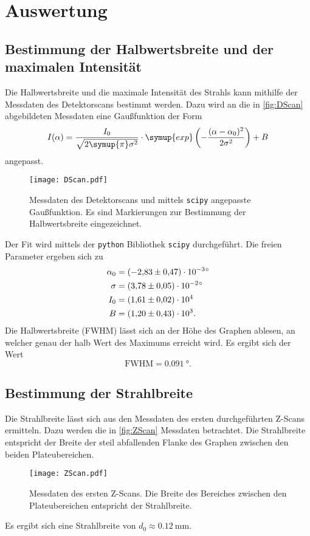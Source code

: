 \section{Auswertung}
\label{sec:Auswertung}

\subsection{Bestimmung der Halbwertsbreite und der maximalen Intensität}
Die Halbwertsbreite und die maximale Intensität des Strahls kann mithilfe der Messdaten des Detektorscans bestimmt werden.
Dazu wird an die in \autoref{fig:DScan} abgebildeten Messdaten eine Gaußfunktion der Form
\begin{equation*}
  I(\alpha) = \frac{I_0}{\sqrt{2\symup{\pi}\sigma^2}}\cdot \symup{exp}\left(-\frac{(\alpha - \alpha_0)^2}{2\sigma^2}\right) + B
\end{equation*} 
angepasst. 
\begin{figure}
  \centering
  \texttt{[image: DScan.pdf]}
  \caption{Messdaten des Detektorscans und mittels \texttt{scipy} \cite{scipy} angepasste Gaußfunktion. Es sind Markierungen zur Bestimmung der Halbwertsbreite eingezeichnet.}
  \label{fig:DScan}
\end{figure}
Der Fit wird mittels der \texttt{python} Bibliothek \texttt{scipy} \cite{scipy} durchgeführt.
Die freien Parameter ergeben sich zu
\begin{align*}
  \alpha_0 &= \qty{-2.83 +-0.47e-3}{\degree} \\
  \sigma &= \qty{3.78 +- 0.05e-2}{\degree} \\
  I_0 &= \num{1.61 +- 0.02e4} \\
  B &= \num{1.20 +- 0.43e3}.
\end{align*}
Die Halbwertsbreite (FWHM) lässt sich an der Höhe des Graphen ablesen, an welcher genau der halb Wert des Maximums erreicht wird. 
Es ergibt sich der Wert 
\begin{equation*}
  \text{FWHM} = \qty{0.091}{\degree}.
\end{equation*}


\subsection{Bestimmung der Strahlbreite}
Die Strahlbreite lässt sich aus den Messdaten des ersten durchgeführten Z-Scans ermitteln. Dazu werden die in \autoref{fig:ZScan} Messdaten betrachtet.
Die Strahlbreite entspricht der Breite der steil abfallenden Flanke des Graphen zwischen den beiden Plateubereichen.
\begin{figure}
  \centering
  \texttt{[image: ZScan.pdf]}
  \caption{Messdaten des ersten Z-Scans. Die Breite des Bereiches zwischen den Plateubereichen entspricht der Strahlbreite.}
  \label{fig:ZScan}
\end{figure}
Es ergibt sich eine Strahlbreite von $d_0 \approx \qty{0.12}{\milli\metre}$. 

